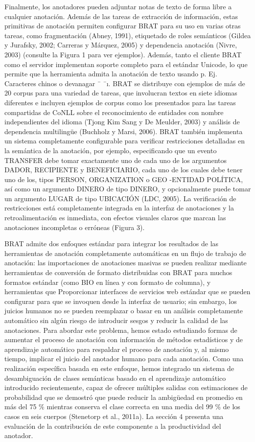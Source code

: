 Finalmente, los anotadores pueden adjuntar notas de texto de forma libre a cualquier anotación. Además de las tareas de extracción de información, estas primitivas de anotación permiten configurar BRAT para su uso en varias otras tareas, como fragmentación (Abney, 1991), etiquetado de roles semánticos (Gildea y Jurafsky, 2002; Carreras y Márquez, 2005) y dependencia anotación (Nivre, 2003) (consulte la Figura 1 para ver ejemplos). Además, tanto el cliente BRAT como el servidor implementan soporte completo para el estándar Unicode, lo que permite que la herramienta admita la anotación de texto usando p. Ej. Caracteres chinos o devanagar ¯ ¯ı. BRAT se distribuye con ejemplos de más de 20 corpus para una variedad de tareas, que involucran textos en siete idiomas diferentes e incluyen ejemplos de corpus como los presentados para las tareas compartidas de CoNLL sobre el reconocimiento de entidades con nombre independientes del idioma (Tjong Kim Sang y De Meulder, 2003) y análisis de dependencia multilingüe (Buchholz y Marsi, 2006). BRAT también implementa un sistema completamente configurable para verificar restricciones detalladas en la semántica de la anotación, por ejemplo, especificando que un evento TRANSFER debe tomar exactamente uno de cada uno de los argumentos DADOR, RECIPIENTE y BENEFICIARIO, cada uno de los cuales debe tener uno de los, tipos PERSON, ORGANIZATION o GEO -ENTIDAD POLÍTICA, así como un argumento DINERO de tipo DINERO, y opcionalmente puede tomar un argumento LUGAR de tipo UBICACIÓN (LDC, 2005). La verificación de restricciones está completamente integrada en la interfaz de anotaciones y la retroalimentación es inmediata, con efectos visuales claros que marcan las anotaciones incompletas o erróneas (Figura 3).

BRAT admite dos enfoques estándar para integrar los resultados de las herramientas de anotación completamente automáticas en un flujo de trabajo de anotación: las importaciones de anotaciones masivas se pueden realizar mediante herramientas de conversión de formato distribuidas con BRAT para muchos formatos estándar (como BIO en línea y con formato de columna), y herramientas que Proporcionar interfaces de servicios web estándar que se pueden configurar para que se invoquen desde la interfaz de usuario; sin embargo, los juicios humanos no se pueden reemplazar o basar en un análisis completamente automático sin algún riesgo de introducir sesgos y reducir la calidad de las anotaciones. Para abordar este problema, hemos estado estudiando formas de aumentar el proceso de anotación con información de métodos estadísticos y de aprendizaje automático para respaldar el proceso de anotación y, al mismo tiempo, implicar el juicio del anotador humano para cada anotación. Como una realización específica basada en este enfoque, hemos integrado un sistema de desambiguación de clases semánticas basado en el aprendizaje automático introducido recientemente, capaz de ofrecer múltiples salidas con estimaciones de probabilidad que se demostró que puede reducir la ambigüedad en promedio en más del 75 \% mientras conserva el clase correcta en una media del 99 \% de los casos en seis cuerpos (Stenetorp et al., 2011a). La sección 4 presenta una evaluación de la contribución de este componente a la productividad del anotador.

